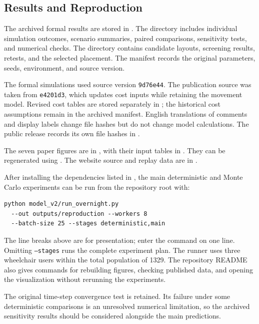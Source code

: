 \subsection{Results and Reproduction}

The archived formal results are stored in
.
The  directory includes individual simulation outcomes, scenario summaries, paired comparisons, sensitivity tests, and numerical checks. The  directory contains candidate layouts, screening results, retests, and the selected placement. The manifest records the original parameters, seeds, environment, and source version.

The formal simulations used source version \texttt{9d76e44}. The publication source was taken from \texttt{e4201d3}, which updates cost inputs while retaining the movement model. Revised cost tables are stored separately in ; the historical cost assumptions remain in the archived manifest. English translations of comments and display labels change file hashes but do not change model calculations. The public release records its own file hashes in .

The seven paper figures are in , with their input tables in . They can be regenerated using . The website source and replay data are in .

After installing the dependencies listed in , the main deterministic and Monte Carlo experiments can be run from the repository root with:
\begin{lstlisting}[basicstyle=\ttfamily\small,breaklines=true,frame=single]
python model_v2/run_overnight.py 
  --out outputs/reproduction --workers 8 
  --batch-size 25 --stages deterministic,main
\end{lstlisting}
The line breaks above are for presentation; enter the command on one line. Omitting \texttt{--stages} runs the complete experiment plan. The runner uses three wheelchair users within the total population of 1329. The repository README also gives commands for rebuilding figures, checking published data, and opening the visualization without rerunning the experiments.

The original time-step convergence test is retained. Its failure under some deterministic comparisons is an unresolved numerical limitation, so the archived sensitivity results should be considered alongside the main predictions.
